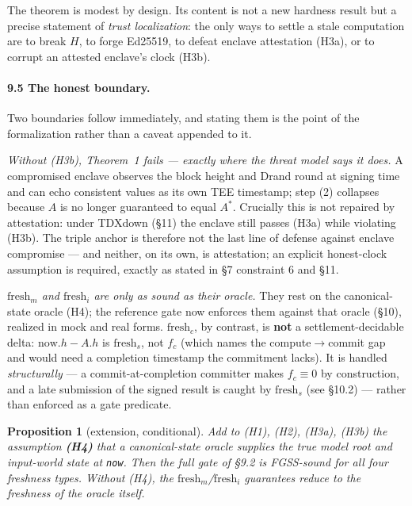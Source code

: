 \documentclass[11pt]{article}
\newtheorem{proposition}[theorem]{Proposition}
\begin{document}
The theorem is modest by design. Its content is not a new hardness result but a precise statement of \emph{trust localization}: the only ways to settle a stale computation are to break $H$, to forge Ed25519, to defeat enclave attestation (H3a), or to corrupt an attested enclave's clock (H3b).

\paragraph{9.5 The honest boundary.} Two boundaries follow immediately, and stating them is the point of the formalization rather than a caveat appended to it.

\emph{Without (H3b), Theorem~1 fails --- exactly where the threat model says it does.} A compromised enclave observes the block height and Drand round at signing time and can echo consistent values as its own TEE timestamp; step (2) collapses because $A$ is no longer guaranteed to equal $A^*$. Crucially this is not repaired by attestation: under TDXdown (\S11) the enclave still passes (H3a) while violating (H3b). The triple anchor is therefore not the last line of defense against enclave compromise --- and neither, on its own, is attestation; an explicit honest-clock assumption is required, exactly as stated in \S7 constraint 6 and \S11.

\emph{$\mathrm{fresh}_m$ and $\mathrm{fresh}_i$ are only as sound as their oracle.} They rest on the canonical-state oracle (H4); the reference gate now enforces them against that oracle (\S10), realized in mock and real forms. $\mathrm{fresh}_c$, by contrast, is \textbf{not} a settlement-decidable delta: $\mathrm{now}.h - A.h$ is $\mathrm{fresh}_s$, not $f_c$ (which names the compute$\to$commit gap and would need a completion timestamp the commitment lacks). It is handled \emph{structurally} --- a commit-at-completion committer makes $f_c \equiv 0$ by construction, and a late submission of the signed result is caught by $\mathrm{fresh}_s$ (see \S10.2) --- rather than enforced as a gate predicate.

\begin{proposition}[extension, conditional]
Add to (H1), (H2), (H3a), (H3b) the assumption \textbf{(H4)} that a canonical-state oracle supplies the true model root and input-world state at \texttt{now}. Then the full gate of \S9.2 is FGSS-sound for all four freshness types. Without (H4), the $\mathrm{fresh}_m$/$\mathrm{fresh}_i$ guarantees reduce to the freshness of the oracle itself.
\end{proposition}
\end{document}
